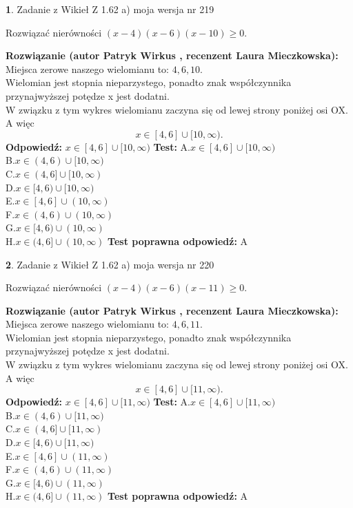 \documentclass[12pt, a4paper]{article}
\theoremstyle{definition} %
\newtheorem{zad}{}
\newcommand{\zadStart}[1]{\begin{zad}#1\newline}
\newcommand{\zadStop}{\end{zad}}
\newcommand{\rozwStart}[2]{\noindent \textbf{Rozwiązanie (autor #1 , recenzent #2): }\newline}
\newcommand{\rozwStop}{\newline}
\newcommand{\odpStart}{\noindent \textbf{Odpowiedź:}\newline}
\newcommand{\odpStop}{\newline}
\newcommand{\testStart}{\noindent \textbf{Test:}\newline}
\newcommand{\testStop}{\newline}
\newcommand{\kluczStart}{\noindent \textbf{Test poprawna odpowiedź:}\newline}
\newcommand{\kluczStop}{\newline}
\begin{document}
\zadStart{Zadanie z Wikieł Z 1.62 a) moja wersja nr 219}

Rozwiązać nierówności $(x-4)(x-6)(x-10)\ge0$.
\zadStop
\rozwStart{Patryk Wirkus}{Laura Mieczkowska}
Miejsca zerowe naszego wielomianu to: $4, 6, 10$.\\
Wielomian jest stopnia nieparzystego, ponadto znak współczynnika przy\linebreak najwyższej potędze x jest dodatni.\\ W związku z tym wykres wielomianu zaczyna się od lewej strony poniżej osi OX. A więc $$x \in [4,6] \cup [10,\infty).$$
\rozwStop
\odpStart
$x \in [4,6] \cup [10,\infty)$
\odpStop
\testStart
A.$x \in [4,6] \cup [10,\infty)$\\
B.$x \in (4,6) \cup [10,\infty)$\\
C.$x \in (4,6] \cup [10,\infty)$\\
D.$x \in [4,6) \cup [10,\infty)$\\
E.$x \in [4,6] \cup (10,\infty)$\\
F.$x \in (4,6) \cup (10,\infty)$\\
G.$x \in [4,6) \cup (10,\infty)$\\
H.$x \in (4,6] \cup (10,\infty)$
\testStop
\kluczStart
A
\kluczStop



\zadStart{Zadanie z Wikieł Z 1.62 a) moja wersja nr 220}

Rozwiązać nierówności $(x-4)(x-6)(x-11)\ge0$.
\zadStop
\rozwStart{Patryk Wirkus}{Laura Mieczkowska}
Miejsca zerowe naszego wielomianu to: $4, 6, 11$.\\
Wielomian jest stopnia nieparzystego, ponadto znak współczynnika przy\linebreak najwyższej potędze x jest dodatni.\\ W związku z tym wykres wielomianu zaczyna się od lewej strony poniżej osi OX. A więc $$x \in [4,6] \cup [11,\infty).$$
\rozwStop
\odpStart
$x \in [4,6] \cup [11,\infty)$
\odpStop
\testStart
A.$x \in [4,6] \cup [11,\infty)$\\
B.$x \in (4,6) \cup [11,\infty)$\\
C.$x \in (4,6] \cup [11,\infty)$\\
D.$x \in [4,6) \cup [11,\infty)$\\
E.$x \in [4,6] \cup (11,\infty)$\\
F.$x \in (4,6) \cup (11,\infty)$\\
G.$x \in [4,6) \cup (11,\infty)$\\
H.$x \in (4,6] \cup (11,\infty)$
\testStop
\kluczStart
A
\kluczStop
\end{document}
